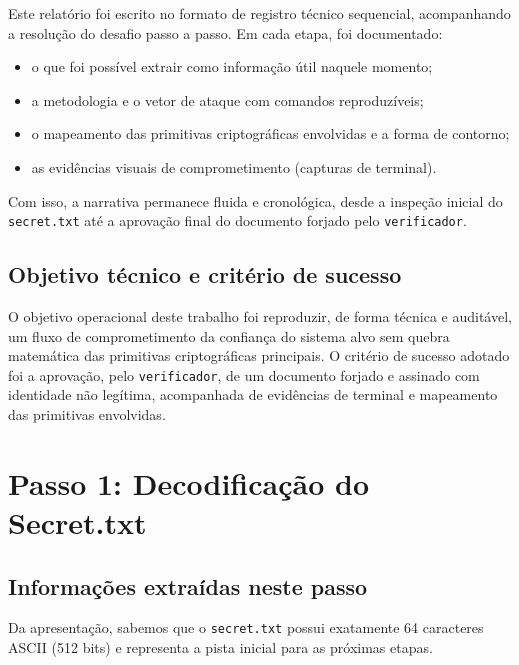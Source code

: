 \documentclass[12pt,a4paper]{article}
\begin{document}
Este relatório foi escrito no formato de registro técnico sequencial, acompanhando a resolução do desafio passo a passo. Em cada etapa, foi documentado:

\begin{itemize}
    \item o que foi possível extrair como informação útil naquele momento;
    \item a metodologia e o vetor de ataque com comandos reproduzíveis;
    \item o mapeamento das primitivas criptográficas envolvidas e a forma de contorno;
    \item as evidências visuais de comprometimento (capturas de terminal).
\end{itemize}

Com isso, a narrativa permanece fluida e cronológica, desde a inspeção inicial do \texttt{secret.txt} até a aprovação final do documento forjado pelo \texttt{verificador}.

\subsection{Objetivo técnico e critério de sucesso}

O objetivo operacional deste trabalho foi reproduzir, de forma técnica e auditável, um fluxo de comprometimento da confiança do sistema alvo sem quebra matemática das primitivas criptográficas principais.
O critério de sucesso adotado foi a aprovação, pelo \texttt{verificador}, de um documento forjado e assinado com identidade não legítima, acompanhada de evidências de terminal e mapeamento das primitivas envolvidas.


\section{Passo 1: Decodificação do Secret.txt}

\subsection{Informações extraídas neste passo}

Da apresentação, sabemos que o \texttt{secret.txt} possui exatamente 64 caracteres ASCII (512 bits) e representa a pista inicial para as próximas etapas.
\end{document}
